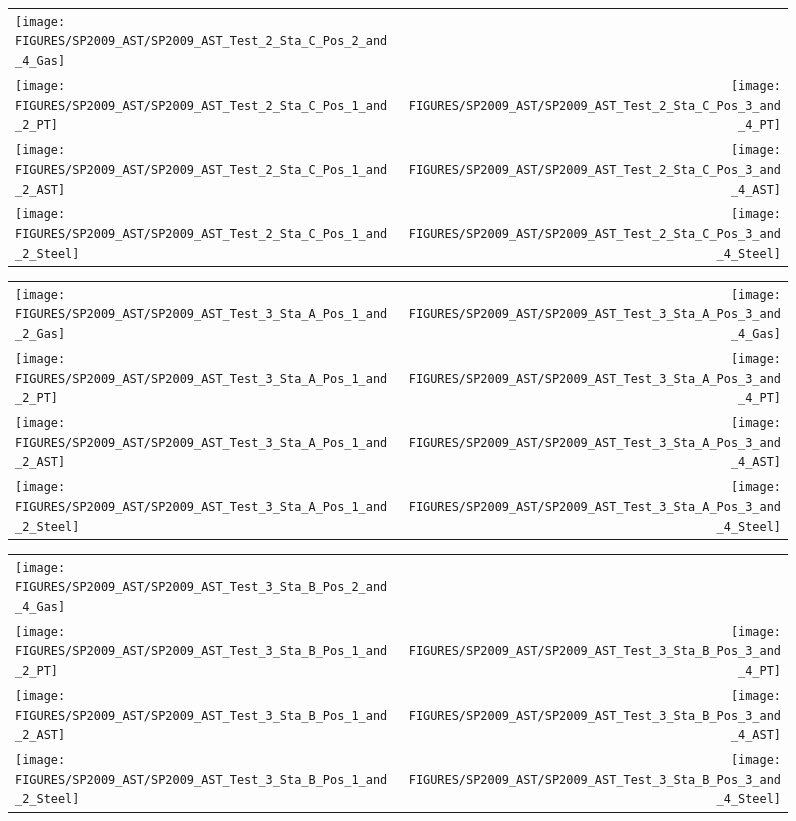 \begin{figure}[p]
\begin{tabular*}{\textwidth}{l@{\extracolsep{\fill}}r}
\texttt{[image: FIGURES/SP2009\_AST/SP2009\_AST\_Test\_2\_Sta\_C\_Pos\_2\_and\_4\_Gas]} &
  \\
\texttt{[image: FIGURES/SP2009\_AST/SP2009\_AST\_Test\_2\_Sta\_C\_Pos\_1\_and\_2\_PT]} &
\texttt{[image: FIGURES/SP2009\_AST/SP2009\_AST\_Test\_2\_Sta\_C\_Pos\_3\_and\_4\_PT]} \\
\texttt{[image: FIGURES/SP2009\_AST/SP2009\_AST\_Test\_2\_Sta\_C\_Pos\_1\_and\_2\_AST]} &
\texttt{[image: FIGURES/SP2009\_AST/SP2009\_AST\_Test\_2\_Sta\_C\_Pos\_3\_and\_4\_AST]} \\
\texttt{[image: FIGURES/SP2009\_AST/SP2009\_AST\_Test\_2\_Sta\_C\_Pos\_1\_and\_2\_Steel]} &
\texttt{[image: FIGURES/SP2009\_AST/SP2009\_AST\_Test\_2\_Sta\_C\_Pos\_3\_and\_4\_Steel]}
\end{tabular*}
\label{SP_Test_2_Station_C}
\end{figure}


\begin{figure}[p]
\begin{tabular*}{\textwidth}{l@{\extracolsep{\fill}}r}
\texttt{[image: FIGURES/SP2009\_AST/SP2009\_AST\_Test\_3\_Sta\_A\_Pos\_1\_and\_2\_Gas]} &
\texttt{[image: FIGURES/SP2009\_AST/SP2009\_AST\_Test\_3\_Sta\_A\_Pos\_3\_and\_4\_Gas]} \\
\texttt{[image: FIGURES/SP2009\_AST/SP2009\_AST\_Test\_3\_Sta\_A\_Pos\_1\_and\_2\_PT]} &
\texttt{[image: FIGURES/SP2009\_AST/SP2009\_AST\_Test\_3\_Sta\_A\_Pos\_3\_and\_4\_PT]} \\
\texttt{[image: FIGURES/SP2009\_AST/SP2009\_AST\_Test\_3\_Sta\_A\_Pos\_1\_and\_2\_AST]} &
\texttt{[image: FIGURES/SP2009\_AST/SP2009\_AST\_Test\_3\_Sta\_A\_Pos\_3\_and\_4\_AST]} \\
\texttt{[image: FIGURES/SP2009\_AST/SP2009\_AST\_Test\_3\_Sta\_A\_Pos\_1\_and\_2\_Steel]} &
\texttt{[image: FIGURES/SP2009\_AST/SP2009\_AST\_Test\_3\_Sta\_A\_Pos\_3\_and\_4\_Steel]}
\end{tabular*}
\label{SP_Test_3_Station_A}
\end{figure}

\begin{figure}[p]
\begin{tabular*}{\textwidth}{l@{\extracolsep{\fill}}r}
\texttt{[image: FIGURES/SP2009\_AST/SP2009\_AST\_Test\_3\_Sta\_B\_Pos\_2\_and\_4\_Gas]} &
  \\
\texttt{[image: FIGURES/SP2009\_AST/SP2009\_AST\_Test\_3\_Sta\_B\_Pos\_1\_and\_2\_PT]} &
\texttt{[image: FIGURES/SP2009\_AST/SP2009\_AST\_Test\_3\_Sta\_B\_Pos\_3\_and\_4\_PT]} \\
\texttt{[image: FIGURES/SP2009\_AST/SP2009\_AST\_Test\_3\_Sta\_B\_Pos\_1\_and\_2\_AST]} &
\texttt{[image: FIGURES/SP2009\_AST/SP2009\_AST\_Test\_3\_Sta\_B\_Pos\_3\_and\_4\_AST]} \\
\texttt{[image: FIGURES/SP2009\_AST/SP2009\_AST\_Test\_3\_Sta\_B\_Pos\_1\_and\_2\_Steel]} &
\texttt{[image: FIGURES/SP2009\_AST/SP2009\_AST\_Test\_3\_Sta\_B\_Pos\_3\_and\_4\_Steel]}
\end{tabular*}
\label{SP_Test_3_Station_B}
\end{figure}

